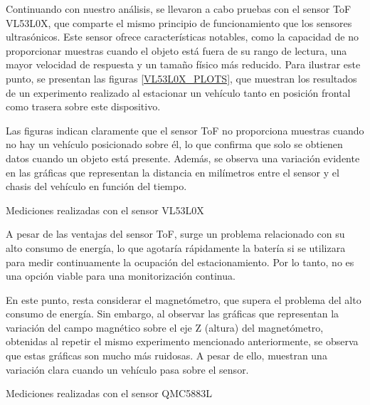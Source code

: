 Continuando con nuestro análisis, se llevaron a cabo pruebas con el sensor ToF VL53L0X, que comparte el mismo principio de funcionamiento que los sensores ultrasónicos. Este sensor ofrece características notables, como la capacidad de no proporcionar muestras cuando el objeto está fuera de su rango de lectura, una mayor velocidad de respuesta y un tamaño físico más reducido. Para ilustrar este punto, se presentan las figuras \ref{VL53L0X_PLOTS}, que muestran los resultados de un experimento realizado al estacionar un vehículo tanto en posición frontal como trasera sobre este dispositivo.

Las figuras indican claramente que el sensor ToF no proporciona muestras cuando no hay un vehículo posicionado sobre él, lo que confirma que solo se obtienen datos cuando un objeto está presente. Además, se observa una variación evidente en las gráficas que representan la distancia en milímetros entre el sensor y el chasis del vehículo en función del tiempo.

\begin{images}[\label{VL53L0X_PLOTS}]{Mediciones realizadas con el sensor VL53L0X}
\end{images}

A pesar de las ventajas del sensor ToF, surge un problema relacionado con su alto consumo de energía, lo que agotaría rápidamente la batería si se utilizara para medir continuamente la ocupación del estacionamiento. Por lo tanto, no es una opción viable para una monitorización continua.

En este punto, resta considerar el magnetómetro, que supera el problema del alto consumo de energía. Sin embargo, al observar las gráficas que representan la variación del campo magnético sobre el eje Z (altura) del magnetómetro, obtenidas al repetir el mismo experimento mencionado anteriormente, se observa que estas gráficas son mucho más ruidosas. A pesar de ello, muestran una variación clara cuando un vehículo pasa sobre el sensor.

\begin{images}[\label{QMC5883L_PLOT}]{Mediciones realizadas con el sensor QMC5883L}
\end{images}

